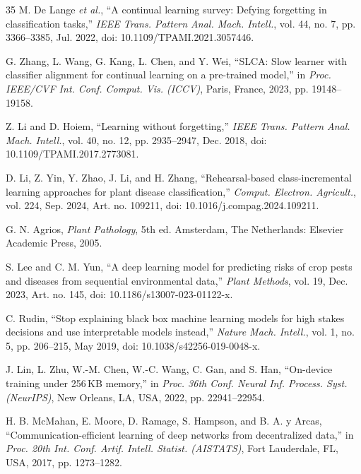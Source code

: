 \documentclass[journal]{IEEEtran}
\begin{document}
\begin{thebibliography}{35}
M. De Lange \emph{et al.}, ``A continual learning survey: Defying forgetting in
classification tasks,'' \emph{IEEE Trans. Pattern Anal. Mach. Intell.}, vol. 44,
no. 7, pp. 3366--3385, Jul. 2022, doi: 10.1109/TPAMI.2021.3057446.

G. Zhang, L. Wang, G. Kang, L. Chen, and Y. Wei, ``SLCA: Slow learner with classifier
alignment for continual learning on a pre-trained model,'' in \emph{Proc. IEEE/CVF
Int. Conf. Comput. Vis. (ICCV)}, Paris, France, 2023, pp. 19148--19158.

Z. Li and D. Hoiem, ``Learning without forgetting,'' \emph{IEEE Trans. Pattern Anal.
Mach. Intell.}, vol. 40, no. 12, pp. 2935--2947, Dec. 2018,
doi: 10.1109/TPAMI.2017.2773081.

D. Li, Z. Yin, Y. Zhao, J. Li, and H. Zhang, ``Rehearsal-based class-incremental
learning approaches for plant disease classification,'' \emph{Comput. Electron.
Agricult.}, vol. 224, Sep. 2024, Art. no. 109211,
doi: 10.1016/j.compag.2024.109211.

G. N. Agrios, \emph{Plant Pathology}, 5th ed. Amsterdam, The Netherlands: Elsevier
Academic Press, 2005.

S. Lee and C. M. Yun, ``A deep learning model for predicting risks of crop pests and
diseases from sequential environmental data,'' \emph{Plant Methods}, vol. 19,
Dec. 2023, Art. no. 145, doi: 10.1186/s13007-023-01122-x.

C. Rudin, ``Stop explaining black box machine learning models for high stakes
decisions and use interpretable models instead,'' \emph{Nature Mach. Intell.},
vol. 1, no. 5, pp. 206--215, May 2019, doi: 10.1038/s42256-019-0048-x.

J. Lin, L. Zhu, W.-M. Chen, W.-C. Wang, C. Gan, and S. Han, ``On-device training
under 256\,KB memory,'' in \emph{Proc. 36th Conf. Neural Inf. Process. Syst.
(NeurIPS)}, New Orleans, LA, USA, 2022, pp. 22941--22954.

H. B. McMahan, E. Moore, D. Ramage, S. Hampson, and B. A. y Arcas,
``Communication-efficient learning of deep networks from decentralized data,'' in
\emph{Proc. 20th Int. Conf. Artif. Intell. Statist. (AISTATS)}, Fort Lauderdale, FL,
USA, 2017, pp. 1273--1282.


\end{thebibliography}
\end{document}
